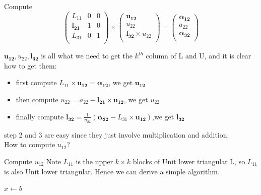 \documentclass[9pt]{beamer}
\newcommand{\ccb}[1]{{\color{blue}#1}}
\begin{document}
	\begin{frame}{Compute}
		\[
		\left( \begin{array}{ccc} L_{11} & 0  & 0\\ \pmb{l_{21}} & 1  & 0\\  L_{31} & 0  & 1\\ \end{array} \right) \times\left( \begin{array}{ccc} \pmb{u_{12}}   \\ u_{22}   \\  \pmb{l_{32}}\times u_{22} \\ \end{array} \right) = \left( \begin{array}{ccc}  \pmb{\alpha_{12}} \\ a_{22}\\ \pmb{\alpha_{32}}  \\ \end{array} \right)
		\]\bigskip
		
		\ccb{$\pmb{u_{12}},u_{22},\pmb{l_{32}}$} is all what we need to get the \ccb{$k^{th}$} column of L and U, and it is clear how to get them:
		\begin{itemize}
			\item first compute $L_{11}\times \pmb{u_{12}} = \pmb{\alpha_{12}}$, we get $\pmb{u_{12}}$
			\item then compute $  u_{22} = a_{22} - \pmb{l_{21}} \times  \pmb{u_{12}}$, we get $u_{22}$
			\item finally compute  $ \pmb{l_{32}}  =\frac{1}{u_{22}}( \pmb{\alpha_{32}} - L_{31}\times \pmb{u_{12}})$,we get $ \pmb{l_{32}}$
		\end{itemize}\pause
		step 2 and 3 are easy since they just involve multiplication and addition.\\
		How to compute \ccb{$u_{12}$}?
	\end{frame}

	\begin{frame}{Compute $u_{12}$}
		Note \ccb{$L_{11}$} is the upper \ccb{$k\times k$} blocks of Unit lower triangular L, so \ccb{$L_{11}$} is also Unit lower triangular. Hence we can derive a simple algorithm.
		\begin{exampleblock}{}
			\begin{algorithm}[H]
			$x\gets b$\;
			{
			}
			\end{algorithm}
		\end{exampleblock}
	\end{frame}
\end{document}
